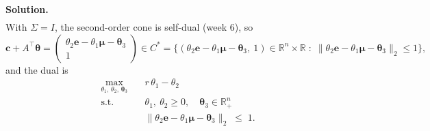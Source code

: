 \documentclass[10pt]{article}
\newenvironment{solution}
  {\par\smallskip\begingroup\color{solink}\textbf{Solution.}\ }
  {\par\endgroup}
\begin{document}
\begin{parts}
\begin{solution}
\[\begin{aligned}
\end{aligned}
\]
With $\Sigma = I$, the second-order cone is self-dual (week 6), so
\[
  \bm{c} + A^{\top}\bm{\theta}
  = \begin{pmatrix} \theta_2 \bm{e} - \theta_1 \bm{\mu} - \bm{\theta}_3 \\ 1 \end{pmatrix}
  \in C^{*} = \big\{ (\theta_2 \bm{e} - \theta_1 \bm{\mu} - \bm{\theta}_3,\ 1) \in \mathbb{R}^n \times \mathbb{R} \;:\;
      \|\theta_2 \bm{e} - \theta_1 \bm{\mu} - \bm{\theta}_3\|_2 \le 1 \big\},
\]
and the dual is
\[
\begin{aligned}
  \max_{\theta_1,\, \theta_2,\, \bm{\theta}_3} \quad & r\,\theta_1 - \theta_2 \\
  \text{s.t.} \quad & \theta_1,\ \theta_2 \ge 0, \quad \bm{\theta}_3 \in \mathbb{R}^n_+ \\
                    & \|\theta_2 \bm{e} - \theta_1 \bm{\mu} - \bm{\theta}_3\|_2 \;\le\; 1 .
\end{aligned}
\]
\end{solution}
\end{parts}
\end{document}

